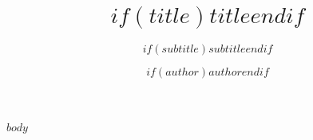 \documentclass[..]{_config/gru}
\title{$if(title)$$title$$endif$}
\subtitle{$if(subtitle)$$subtitle$$endif$}
\author{$if(author)$$author$$endif$}
\institute{$if(institute)$$institute$$endif$}
\begin{document}

\pagebreak

\maketheistitle

$body$
\end{document}
